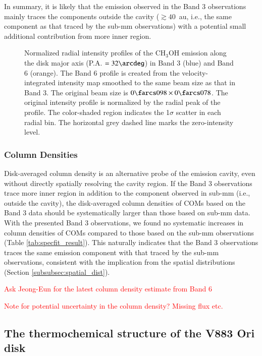 \documentclass[linenumbers, twocolumn, twocolappendix, astrosymb, times]{aastex631}
\newcommand{\methanol}{CH$_3$OH\xspace}
\begin{document}
In summary, it is likely that the emission observed in the Band 3 observations mainly traces the components outside the cavity ($\gtrsim 40\,$ au, i.e., the same component as that traced by the sub-mm observations) with a potential small additional contribution from more inner region. 


\begin{figure}
\caption{Normalized radial intensity profiles of the \methanol emission along the disk major axis (P.A. $= 32\arcdeg$) in Band 3 (blue) and Band 6 (orange). The Band 6 profile is created from the velocity-integrated intensity map smoothed to the same beam size as that in Band 3. The original beam size is $0\farcs098\times0\farcs078$. The original intensity profile is normalized by the radial peak of the profile. The color-shaded region indicates the 1$\sigma$ scatter in each radial bin. The horizontal grey dashed line marks the zero-intensity level.}
\label{fig:radial_profile_CH3OH}
\end{figure}





\subsubsection{Column Densities}
Disk-averaged column density is an alternative probe of the emission cavity, even without directly spatially resolving the cavity region. If the Band 3 observations trace more inner region in addition to the component observed in sub-mm (i.e., outside the cavity), the disk-averaged column densities of COMs based on the Band 3 data should be systematically larger than those based on sub-mm data. With the presented Band 3 observations, we found no systematic increases in column densities of COMs compared to those based on the sub-mm observations (Table \ref{tab:specfit_result}). This naturally indicates that the Band 3 observations traces the same emission component with that traced by the sub-mm observations, consistent with the implication from the spatial distributions (Section \ref{subsubsec:spatial_dist}). 

\textcolor{red}{Ask Jeong-Eun for the latest column density estimate from Band 6}

\textcolor{red}{Note for potential uncertainty in the column density? Missing flux etc.}

\subsection{The thermochemical structure of the V883 Ori disk}
\end{document}
